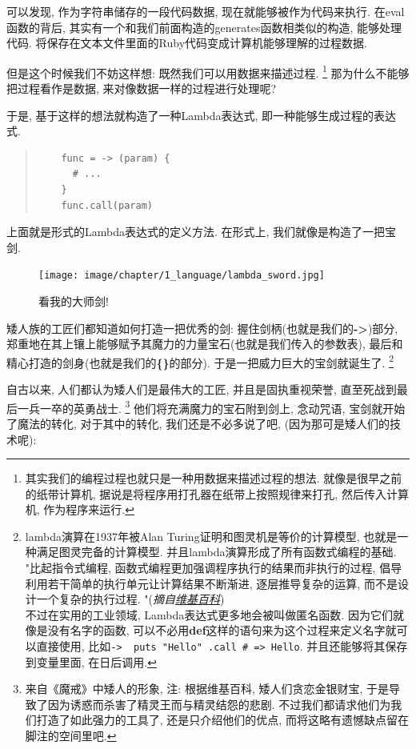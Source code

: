 可以发现, 作为字符串储存的一段代码数据, 现在就能够被作为代码来执行. 在eval函数的背后, 其实有一个和我们前面构造的generates函数相类似的构造, 能够处理代码. 将保存在文本文件里面的Ruby代码变成计算机能够理解的过程数据. 

但是这个时候我们不妨这样想: 既然我们可以用数据来描述过程. \footnote{其实我们的编程过程也就只是一种用数据来描述过程的想法. 就像是很早之前的纸带计算机, 据说是将程序用打孔器在纸带上按照规律来打孔, 然后传入计算机, 作为程序来运行. } 那为什么不能够把过程看作是数据, 来对像数据一样的过程进行处理呢? 

于是, 基于这样的想法就构造了一种Lambda表达式, 即一种能够生成过程的表达式. 

\begin{quotation}
  \begin{verbatim}
    func = -> (param) {
      # ...
    }
    func.call(param)
  \end{verbatim}
\end{quotation}

上面就是形式的Lambda表达式的定义方法. 在形式上, 我们就像是构造了一把宝剑. 

\begin{figure}[h]
  \centering
  \texttt{[image: image/chapter/1\_language/lambda\_sword.jpg]}
  \caption{看我的大师剑! }
\end{figure}

矮人族的工匠们都知道如何打造一把优秀的剑: 握住剑柄(也就是我们的\textbf{->})部分, 郑重地在其上镶上能够赋予其魔力的力量宝石(也就是我们传入的参数表), 最后和精心打造的剑身(也就是我们的\textbf{\{\}}的部分). 于是一把威力巨大的宝剑就诞生了. \footnote{lambda演算在1937年被Alan Turing证明和图灵机是等价的计算模型, 也就是一种满足图灵完备的计算模型. 并且lambda演算形成了所有函数式编程的基础. \\"比起指令式编程, 函数式编程更加强调程序执行的结果而非执行的过程, 倡导利用若干简单的执行单元让计算结果不断渐进, 逐层推导复杂的运算, 而不是设计一个复杂的执行过程. "(\emph{摘自\href{https://zh.wikipedia.org/zh-cn/函数式编程}{维基百科}})\\ 不过在实用的工业领域, Lambda表达式更多地会被叫做匿名函数. 因为它们就像是没有名字的函数, 可以不必用\textbf{def}这样的语句来为这个过程来定义名字就可以直接使用, 比如\texttt{-> { puts "Hello" }.call # => Hello}. 并且还能够将其保存到变量里面, 在日后调用. } 

自古以来, 人们都认为矮人们是最伟大的工匠, 并且是固执重视荣誉, 直至死战到最后一兵一卒的英勇战士. \footnote{来自《魔戒》中矮人的形象, 注: 根据维基百科, 矮人们贪恋金银财宝, 于是导致了因为诱惑而杀害了精灵王而与精灵结怨的悲剧. 不过我们都请求他们为我们打造了如此强力的工具了, 还是只介绍他们的优点, 而将这略有遗憾缺点留在脚注的空间里吧. } 他们将充满魔力的宝石附到剑上, 念动咒语, 宝剑就开始了魔法的转化, 对于其中的转化, 我们还是不必多说了吧, (因为那可是矮人们的技术呢): 

